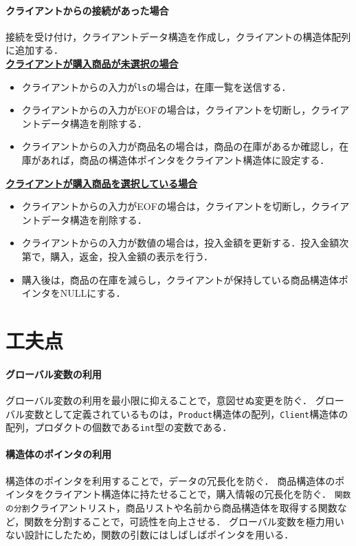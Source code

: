 \documentclass[12pt,dvipdfmx]{jlreq}
\begin{document}
\paragraph{クライアントからの接続があった場合}接続を受け付け，クライアントデータ構造を作成し，クライアントの構造体配列に追加する．\\
\textbf{\underline{クライアントが購入商品が未選択の場合}}
\begin{itemize}
    \item クライアントからの入力が\texttt{ls}の場合は，在庫一覧を送信する．
    \item クライアントからの入力がEOFの場合は，クライアントを切断し，クライアントデータ構造を削除する．
    \item クライアントからの入力が商品名の場合は，商品の在庫があるか確認し，在庫があれば，商品の構造体ポインタをクライアント構造体に設定する．
\end{itemize}
\textbf{\underline{クライアントが購入商品を選択している場合}}
\begin{itemize}
    \item クライアントからの入力がEOFの場合は，クライアントを切断し，クライアントデータ構造を削除する．
    \item クライアントからの入力が数値の場合は，投入金額を更新する．投入金額次第で，購入，返金，投入金額の表示を行う．
    \item 購入後は，商品の在庫を減らし，クライアントが保持している商品構造体ポインタをNULLにする．
\end{itemize}
\section*{工夫点}
\paragraph{グローバル変数の利用}グローバル変数の利用を最小限に抑えることで，意図せぬ変更を防ぐ．
グローバル変数として定義されているものは，\texttt{Product}構造体の配列，\texttt{Client}構造体の配列，プロダクトの個数である\texttt{int}型の変数である．
\paragraph{構造体のポインタの利用}構造体のポインタを利用することで，データの冗長化を防ぐ．
商品構造体のポインタをクライアント構造体に持たせることで，購入情報の冗長化を防ぐ．
\texttt{関数の分割}クライアントリスト，商品リストや名前から商品構造体を取得する関数など，関数を分割することで，可読性を向上させる．
グローバル変数を極力用いない設計にしたため，関数の引数にはしばしばポインタを用いる．
\end{document}
